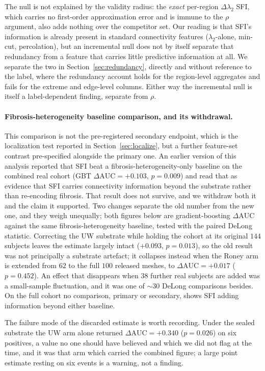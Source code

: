 \documentclass[11pt]{article}
\theoremstyle{definition}
\newcommand{\lam}{\lambda}
\newcommand{\rhoval}{\rho}
\newcommand{\dAUC}{\Delta\mathrm{AUC}}
\begin{document}
The null is not explained by the validity radius: the \emph{exact} per-region
$\Delta\lam_2$ SFI, which carries no first-order approximation error and is
immune to the $\rhoval$ argument, also adds nothing over the competitor set. Our
reading is that SFI's information is already present in standard connectivity
features ($\lam_2$-alone, min-cut, percolation), but an incremental null does
not by itself separate that redundancy from a feature that carries little
predictive information at all. We separate the two in
Section~\ref{sec:redundancy}, directly and without reference to the label, where
the redundancy account holds for the region-level aggregates and fails for the
extreme and edge-level columns. Either way the incremental null is itself a
label-dependent finding, separate from $\rhoval$.

\paragraph{Fibrosis-heterogeneity baseline comparison, and its withdrawal.}
This comparison is not the pre-registered secondary endpoint, which is the
localization test reported in Section~\ref{sec:localize}, but a further
feature-set contrast pre-specified alongside the primary one. An earlier version
of this analysis reported that SFI beat a fibrosis-heterogeneity-only baseline
on the combined real cohort (GBT $\dAUC=+0.103$, $p=0.009$) and read that as
evidence that SFI carries connectivity information beyond the substrate rather
than re-encoding fibrosis. That result does not survive, and we withdraw both it
and the claim it supported. Two changes separate the old number from the new
one, and they weigh unequally; both figures below are gradient-boosting $\dAUC$
against the same fibrosis-heterogeneity baseline, tested with the paired DeLong
statistic. Correcting the UW substrate while holding the cohort at its original
$144$ subjects leaves the estimate largely intact ($+0.093$, $p=0.013$), so the
old result was not principally a substrate artefact; it collapses instead when
the Roney arm is extended from $62$ to the full $100$ released meshes, to
$\dAUC=+0.017$ ($p=0.452$). An effect that disappears when $38$ further real
subjects are added was a small-sample fluctuation, and it was one of
$\sim\!30$ DeLong comparisons besides. On the full cohort no comparison,
primary or secondary, shows SFI adding information beyond either baseline.

The failure mode of the discarded estimate is worth recording. Under the sealed
substrate the UW arm alone returned $\dAUC=+0.340$ ($p=0.026$) on six positives,
a value no one should have believed and which we did not flag at the time, and
it was that arm which carried the combined figure; a large point estimate
resting on six events is a warning, not a finding.
\end{document}

